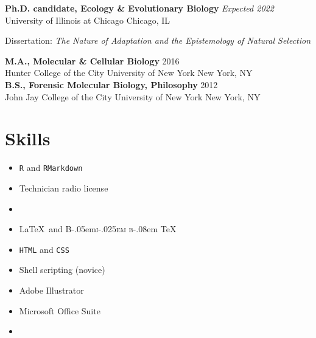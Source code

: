 \documentclass[]{article}
\begin{document}
\textbf{Ph.D. candidate, Ecology \& Evolutionary Biology} \hfill \textit{Expected 2022}\\ 
University of Illinois at Chicago \hfill Chicago, IL
     
Dissertation: \emph{The Nature of Adaptation and the Epistemology of Natural Selection} 
\vspace{0.3cm}

\textbf{M.A., Molecular \& Cellular Biology} \hfill 2016\\ 
Hunter College of the City University of New York \hfill New York, NY\\
     

\textbf{B.S., Forensic Molecular Biology, Philosophy} \hfill 2012\\ 
John Jay College of the City University of New York \hfill New York, NY

\section{Skills}


\begin{multicols}{3}
\begin{itemize}
	\item[\textcolor{light-gray}{\faRProject}]{\texttt{R} and \texttt{RMarkdown}}
	\item[\textcolor{light-gray}{\faBroadcastTower}]{Technician radio license}
	\item[]{}
\end{itemize}

\columnbreak

\begin{itemize}
	\item[\textcolor{light-gray}{\faFilePdf}]{\LaTeX\ and \DeclareRobustCommand{\BibTeX}{%
  {\normalfont B\kern-.05em{\scshape i\kern-.025em b}\kern-.08em \TeX}%
}\BibTeX}
\item[\textcolor{light-gray}{\faFileCode}]{\texttt{HTML} and \texttt{CSS}}
\item[\textcolor{light-gray}{\faFilePrescription}]{Shell scripting (novice)}
\end{itemize}

\columnbreak

\begin{itemize}
	\item[\textcolor{light-gray}{\faDraftingCompass}]{Adobe Illustrator}
	\item[\textcolor{light-gray}{\faMicrosoft}]{Microsoft Office Suite}
	\item[]{}
\end{itemize}

\end{multicols}
\end{document}
